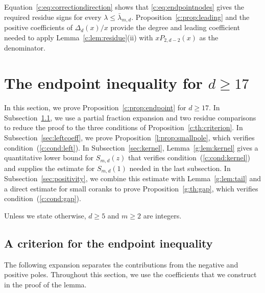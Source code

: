 \documentclass[11pt]{article}
\numberwithin{equation}{section}
\theoremstyle{remark}\newtheorem{remark}[theorem]{Remark}
\begin{document}
Equation~\eqref{c:eq:correctiondirection} shows that
\eqref{c:eq:endpointnodes} gives the required residue signs for every
$\lambda\le\bar\lambda_{m,d}$.
Proposition~\ref{c:prop:leading} and the positive coefficients of
$\Delta_d(x)/x$ provide the degree and leading coefficient needed to
apply Lemma~\ref{c:lem:residue}(ii) with $xP_{2,d-2}(x)$ as the denominator.

\section{The endpoint inequality for \texorpdfstring{$d\ge17$}{d >= 17}}\label{sec:symbol}
In this section, we prove Proposition~\ref{c:prop:endpoint} for $d\ge17$.
In Subsection~\ref{sec:criterion}, we use a partial fraction expansion and
two residue comparisons to reduce the proof to the three conditions of
Proposition~\ref{c:th:criterion}.
In Subsection~\ref{sec:leftcoeff}, we prove
Proposition~\ref{l:prop:smallpole}, which verifies condition~(\ref{c:cond:left}).
In Subsection~\ref{sec:kernel}, Lemma~\ref{g:lem:kernel} gives a quantitative
lower bound for $S_{m,d}(z)$ that verifies condition~(\ref{c:cond:kernel})
and supplies the estimate for $S_{m,d}(1)$ needed in the last subsection.
In Subsection~\ref{sec:positivity}, we combine this estimate with
Lemma~\ref{g:lem:tail} and a direct estimate for small coranks to prove
Proposition~\ref{g:th:gap}, which verifies condition~(\ref{c:cond:gap}).

Unless we state otherwise, $d\ge5$ and $m\ge2$ are integers.
\subsection{A criterion for the endpoint inequality}\label{sec:criterion}
The following expansion separates the contributions from the negative and
positive poles. Throughout this section, we use the coefficients that we
construct in the proof of the lemma.
\end{document}
